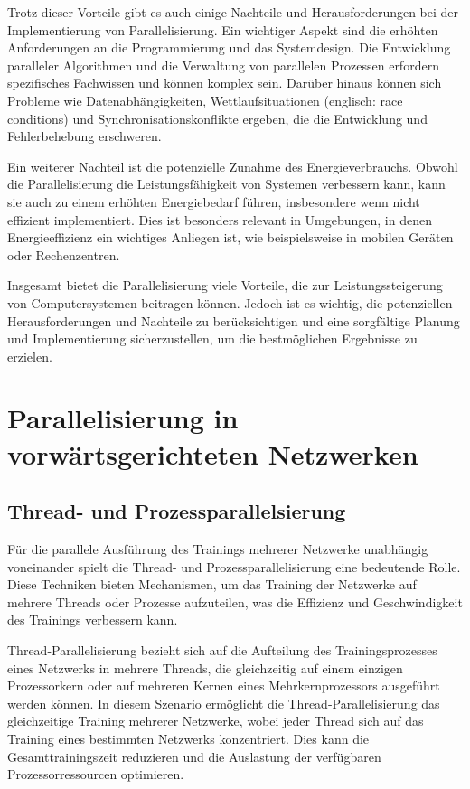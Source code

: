 Trotz dieser Vorteile gibt es auch einige Nachteile und Herausforderungen bei der Implementierung von Parallelisierung. Ein wichtiger Aspekt sind die erhöhten Anforderungen an die Programmierung und das Systemdesign. Die Entwicklung paralleler Algorithmen und die Verwaltung von parallelen Prozessen erfordern spezifisches Fachwissen und können komplex sein. Darüber hinaus können sich Probleme wie Datenabhängigkeiten, Wettlaufsituationen (englisch: race conditions) und Synchronisationskonflikte ergeben, die die Entwicklung und Fehlerbehebung erschweren.

Ein weiterer Nachteil ist die potenzielle Zunahme des Energieverbrauchs. Obwohl die Parallelisierung die Leistungsfähigkeit von Systemen verbessern kann, kann sie auch zu einem erhöhten Energiebedarf führen, insbesondere wenn nicht effizient implementiert. Dies ist besonders relevant in Umgebungen, in denen Energieeffizienz ein wichtiges Anliegen ist, wie beispielsweise in mobilen Geräten oder Rechenzentren.

Insgesamt bietet die Parallelisierung viele Vorteile, die zur Leistungssteigerung von Computersystemen beitragen können. Jedoch ist es wichtig, die potenziellen Herausforderungen und Nachteile zu berücksichtigen und eine sorgfältige Planung und Implementierung sicherzustellen, um die bestmöglichen Ergebnisse zu erzielen.

\section{Parallelisierung in vorwärtsgerichteten Netzwerken}
\label{sec:Grundlagen_Parallelisierung_Neuronale_Netze}
\subsection{Thread- und Prozessparallelsierung}
\label{sec:Grundlagen_Thread_Parallelisierung}
Für die parallele Ausführung des Trainings mehrerer Netzwerke unabhängig voneinander spielt die Thread- und Prozessparallelisierung eine bedeutende Rolle. Diese Techniken bieten Mechanismen, um das Training der Netzwerke auf mehrere Threads oder Prozesse aufzuteilen, was die Effizienz und Geschwindigkeit des Trainings verbessern kann.

Thread-Parallelisierung bezieht sich auf die Aufteilung des Trainingsprozesses eines Netzwerks in mehrere Threads, die gleichzeitig auf einem einzigen Prozessorkern oder auf mehreren Kernen eines Mehrkernprozessors ausgeführt werden können. In diesem Szenario ermöglicht die Thread-Parallelisierung das gleichzeitige Training mehrerer Netzwerke, wobei jeder Thread sich auf das Training eines bestimmten Netzwerks konzentriert. Dies kann die Gesamttrainingszeit reduzieren und die Auslastung der verfügbaren Prozessorressourcen optimieren.

